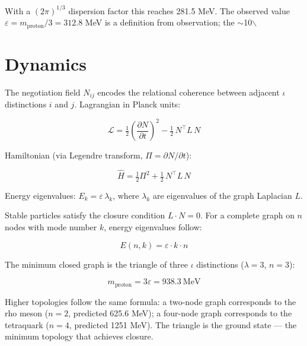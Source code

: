 \documentclass[11pt,letterpaper]{article}
\begin{document}
With a \((2\pi)^{1/3}\) dispersion factor this reaches 281.5 MeV. The observed value \(\varepsilon = m_\text{proton}/3 = 312.8\) MeV is a definition from observation; the \(\sim\)10$\backslash$%

\section{Dynamics}
\label{sec:orgc7a3574}

The negotiation field \(N_{ij}\) encodes the relational coherence between adjacent \(\iota\) distinctions \(i\) and \(j\). Lagrangian in Planck units:

\begin{equation}
\mathcal{L} = \tfrac{1}{2}\!\left(\frac{\partial N}{\partial t}\right)^{\!2} - \tfrac{1}{2}\,N^\top L\, N
\end{equation}

Hamiltonian (via Legendre transform, \(\Pi = \partial N/\partial t\)):

\begin{equation}
\hat{H} = \tfrac{1}{2}\Pi^2 + \tfrac{1}{2}\,N^\top L\, N
\end{equation}

Energy eigenvalues: \(E_k = \varepsilon\,\lambda_k\), where \(\lambda_k\) are eigenvalues of the graph Laplacian \(L\).

Stable particles satisfy the closure condition \(L \cdot N = 0\). For a complete graph on \(n\) nodes with mode number \(k\), energy eigenvalues follow:

\begin{equation}
E(n,k) = \varepsilon \cdot k \cdot n
\end{equation}

The minimum closed graph is the triangle of three \(\iota\) distinctions (\(\lambda = 3\), \(n = 3\)):

\begin{equation}
m_\text{proton} = 3\varepsilon = 938.3\ \text{MeV}
\end{equation}

Higher topologies follow the same formula: a two-node graph corresponds to the rho meson (\(n=2\), predicted 625.6 MeV); a four-node graph corresponds to the tetraquark (\(n=4\), predicted 1251 MeV). The triangle is the ground state --- the minimum topology that achieves closure.
\end{document}
